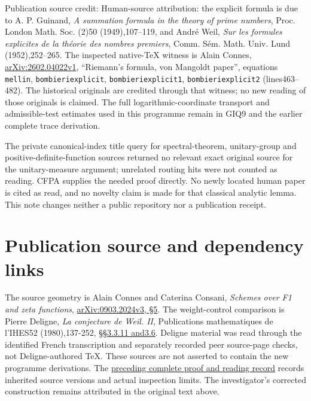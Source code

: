 Publication source credit: Human-source attribution: the explicit
formula is due to A. P. Guinand, \emph{A summation formula in the theory
of prime numbers}, Proc. London Math. Soc. (2)50 (1949),107--119, and
André Weil, \emph{Sur les formules explicites de la théorie des nombres
premiers}, Comm. Sém. Math. Univ. Lund (1952),252--265. The inspected
native-TeX witness is Alain Connes,
\href{https://arxiv.org/abs/2602.04022v1}{arXiv:2602.04022v1},
``Riemann's formula, von Mangoldt paper'', equations \texttt{mellin},
\texttt{bombieriexplicit}, \texttt{bombieriexplicit1},
\texttt{bombieriexplicit2} (lines463--482). The historical originals are
credited through that witness; no new reading of those originals is
claimed. The full logarithmic-coordinate transport and admissible-test
estimates used in this programme remain in GIQ9 and the earlier complete
trace derivation.

The private canonical-index title query for spectral-theorem,
unitary-group and positive-definite-function sources returned no
relevant exact original source for the unitary-measure argument;
unrelated routing hits were not counted as reading. CFPA supplies the
needed proof directly. No newly located human paper is cited as read,
and no novelty claim is made for that classical analytic lemma. This
note changes neither a public repository nor a publication receipt.

\section{Publication source and dependency
links}\label{publication-source-and-dependency-links-4}

The source geometry is Alain Connes and Caterina Consani, \emph{Schemes
over F1 and zeta functions},
\href{https://arxiv.org/abs/0903.2024v3}{arXiv:0903.2024v3, §5}. The
weight-control comparison is Pierre Deligne, \emph{La conjecture de
Weil. II}, Publications mathematiques de l'IHES52 (1980),137-252,
\href{https://www.numdam.org/item/PMIHES_1980__52__137_0/}{§§3.3.11
and3.6}. Deligne material was read through the identified French
transcription and separately recorded peer source-page checks, not
Deligne-authored TeX. These sources are not asserted to contain the new
programme derivations. The
\href{https://github.com/KokunoYumeto/zeta-function-research-reader/blob/36a82ecca98addb8a98b48204e349737856c7223/workbenches/splitzero-tandem/continuations/20260924-cohomology-weight-and-character-lifts/BUILD_AND_REVIEW.md}{preceding
complete proof and reading record} records inherited source versions and
actual inspection limits. The investigator's corrected construction
remains attributed in the original text above.

